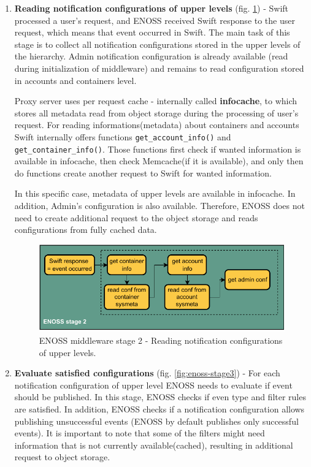 \begin{enumerate}
        \item \textbf{Reading notification configurations of upper levels} (fig. \ref{fig:enoss-stage2}) - Swift processed a user's request, and ENOSS received Swift response to the user request, which means that event occurred in Swift. The main task of this stage is to collect all notification configurations stored in the upper levels of the hierarchy. Admin notification configuration is already available (read during initialization of middleware) and remains to read configuration stored in accounts and containers level.

        Proxy server uses per request cache - internally called \textbf{infocache}, to which stores all metadata read from object storage during the processing of user's request. For reading informations(metadata) about containers and accounts Swift internally offers functions \texttt{get\_account\_info()} and \texttt{get\_container\_info()}. Those functions first check if wanted information is available in infocache, then check Memcache(if it is available), and only then do functions create another request to Swift for wanted information.

        In this specific case, metadata of upper levels are available in infocache. In addition, Admin's configuration is also available. Therefore, ENOSS does not need to create additional request to the object storage and reads configurations from fully cached data.

        \begin{figure}[H]
            \centering
            \includegraphics[width=1\textwidth]{obrazky-figures/enoss-stage2.pdf}
            \caption{ENOSS middleware stage 2 - Reading notification configurations of upper levels.}
            \label{fig:enoss-stage2}
        \end{figure}

        \item \textbf{Evaluate satisfied configurations} (fig. \ref{fig:enoss-stage3}) - For each notification configuration of upper level ENOSS needs to evaluate if event should be published. In this stage, ENOSS checks if even type and filter rules are satisfied. In addition, ENOSS checks if a notification configuration allows publishing unsuccessful events (ENOSS by default publishes only successful events). It is important to note that some of the filters might need information that is not currently available(cached), resulting in additional request to object storage.


\end{enumerate}
